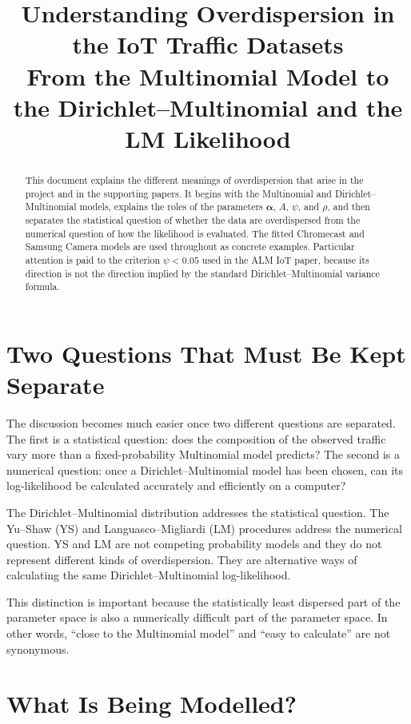 \documentclass[11pt,a4paper]{article}
\title{Understanding Overdispersion in the IoT Traffic Datasets\\[0.4em]
\large From the Multinomial Model to the Dirichlet--Multinomial and the LM Likelihood}
\author{}
\date{}
\begin{document}
\maketitle

\begin{abstract}
This document explains the different meanings of overdispersion that arise in
the project and in the supporting papers.  It begins with the Multinomial and
Dirichlet--Multinomial models, explains the roles of the parameters
$\boldsymbol{\alpha}$, $A$, $\psi$, and $\rho$, and then separates the
statistical question of whether the data are overdispersed from the numerical
question of how the likelihood is evaluated.  The fitted Chromecast and
Samsung Camera models are used throughout as concrete examples.  Particular
attention is paid to the criterion $\psi<0.05$ used in the ALM IoT paper,
because its direction is not the direction implied by the standard
Dirichlet--Multinomial variance formula.
\end{abstract}

\tableofcontents
\newpage

\section{Two Questions That Must Be Kept Separate}

The discussion becomes much easier once two different questions are separated.
The first is a statistical question: does the composition of the observed
traffic vary more than a fixed-probability Multinomial model predicts?  The
second is a numerical question: once a Dirichlet--Multinomial model has been
chosen, can its log-likelihood be calculated accurately and efficiently on a
computer?

The Dirichlet--Multinomial distribution addresses the statistical question.
The Yu--Shaw (YS) and Languasco--Migliardi (LM) procedures address the numerical
question.  YS and LM are not competing probability models and they do not
represent different kinds of overdispersion.  They are alternative ways of
calculating the same Dirichlet--Multinomial log-likelihood.

This distinction is important because the statistically least dispersed part
of the parameter space is also a numerically difficult part of the parameter
space.  In other words, ``close to the Multinomial model'' and ``easy to
calculate'' are not synonymous.

\section{What Is Being Modelled?}
\end{document}
